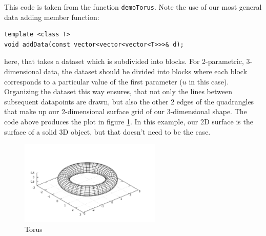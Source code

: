\documentclass[11pt]{article}
\begin{document}
This code is taken from the function \texttt{demoTorus}. Note the use of our most general data adding member function:
\begin{verbatim}
template <class T>
void addData(const vector<vector<vector<T>>>& d);
\end{verbatim}
here, that takes a dataset which is subdivided into blocks. For 2-parametric, 3-dimensional data, the dataset should be divided into blocks where each block corresponds to a particular value of the first parameter ($u$ in this case). Organizing the dataset this way ensures, that not only the lines between subsequent datapoints are drawn, but also the other 2 edges of the quadrangles that make up our 2-dimensional surface grid of our 3-dimensional shape. The code above produces the plot in figure \ref{fig:Torus}. In this example, our 2D surface is the surface of a solid 3D object, but that doesn't need to be the case.
\begin{figure}[h!]
	\centering
  	\includegraphics[width=0.60\textwidth]{Plots/Torus.pdf}
	\caption{Torus}
	\label{fig:Torus}
\end{figure}
\end{document}
